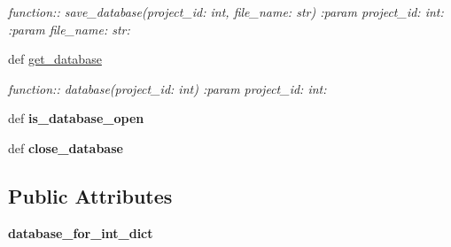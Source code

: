 \begin{DoxyCompactItemize}
\begin{DoxyCompactList}\small\item\em function\+:\+: save\+\_\+database(project\+\_\+id\+: int, file\+\_\+name\+: str) \+:param project\+\_\+id\+: int\+: \+:param file\+\_\+name\+: str\+: \end{DoxyCompactList}\item 
def \hyperlink{classplume-creator_1_1src_1_1plume_1_1data_1_1database__manager_1_1_database_manager_a705841ca00d87b901419c34b007ee0de}{get\+\_\+database}\hypertarget{classplume-creator_1_1src_1_1plume_1_1data_1_1database__manager_1_1_database_manager_a705841ca00d87b901419c34b007ee0de}{}\label{classplume-creator_1_1src_1_1plume_1_1data_1_1database__manager_1_1_database_manager_a705841ca00d87b901419c34b007ee0de}

\begin{DoxyCompactList}\small\item\em function\+:\+: database(project\+\_\+id\+: int) \+:param project\+\_\+id\+: int\+: \end{DoxyCompactList}\item 
def {\bfseries is\+\_\+database\+\_\+open}\hypertarget{classplume-creator_1_1src_1_1plume_1_1data_1_1database__manager_1_1_database_manager_a9816512eccaee6af5508ce3a947a94a2}{}\label{classplume-creator_1_1src_1_1plume_1_1data_1_1database__manager_1_1_database_manager_a9816512eccaee6af5508ce3a947a94a2}

\item 
def {\bfseries close\+\_\+database}\hypertarget{classplume-creator_1_1src_1_1plume_1_1data_1_1database__manager_1_1_database_manager_ac9fc216bb82d252362fd685bea2cd57e}{}\label{classplume-creator_1_1src_1_1plume_1_1data_1_1database__manager_1_1_database_manager_ac9fc216bb82d252362fd685bea2cd57e}

\end{DoxyCompactItemize}
\subsection*{Public Attributes}
\begin{DoxyCompactItemize}
\item 
{\bfseries database\+\_\+for\+\_\+int\+\_\+dict}\hypertarget{classplume-creator_1_1src_1_1plume_1_1data_1_1database__manager_1_1_database_manager_acec7e14b144867b543658161b69eb322}{}\label{classplume-creator_1_1src_1_1plume_1_1data_1_1database__manager_1_1_database_manager_acec7e14b144867b543658161b69eb322}

\end{DoxyCompactItemize}
